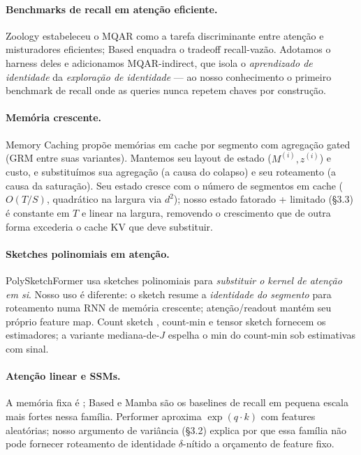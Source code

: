 \documentclass[11pt]{article}
\begin{document}
\paragraph{Benchmarks de recall em aten\c{c}\~ao eficiente.} Zoology
\citep{arora2023zoology} estabeleceu o MQAR como a tarefa discriminante entre
aten\c{c}\~ao e misturadores eficientes; Based \citep{arora2024based} enquadra o
tradeoff recall-vaz\~ao. Adotamos o harness deles e adicionamos MQAR-indirect,
que isola o \emph{aprendizado de identidade} da \emph{explora\c{c}\~ao de
identidade} --- ao nosso conhecimento o primeiro benchmark de recall onde as
queries nunca repetem chaves por constru\c{c}\~ao.

\paragraph{Mem\'oria crescente.} Memory Caching
\citep{behrouz2026memorycaching} prop\~oe mem\'orias em cache por segmento com
agrega\c{c}\~ao gated (GRM entre suas variantes). Mantemos seu layout de estado
($M^{(i)}, z^{(i)}$) e custo, e substitu\'imos sua agrega\c{c}\~ao (a causa do
colapso) e seu roteamento (a causa da satura\c{c}\~ao). Seu estado cresce com o
n\'umero de segmentos em cache ($O(T/S)$, quadr\'atico na largura via $d^2$);
nosso estado fatorado + limitado (\S3.3) \'e constante em $T$ e linear na
largura, removendo o crescimento que de outra forma excederia o cache KV que deve
substituir.

\paragraph{Sketches polinomiais em aten\c{c}\~ao.} PolySketchFormer
\citep{kacham2023polysketchformer} usa sketches polinomiais para
\emph{substituir o kernel de aten\c{c}\~ao em si}. Nosso uso \'e diferente: o
sketch resume a \emph{identidade do segmento} para roteamento numa RNN de
mem\'oria crescente; aten\c{c}\~ao/readout mant\'em seu pr\'oprio feature map.
Count sketch \citep{charikar2002countsketch}, count-min
\citep{cormode2005countmin} e tensor sketch \citep{pham2013tensorsketch}
fornecem os estimadores; a variante mediana-de-$J$ espelha o min do count-min sob
estimativas com sinal.

\paragraph{Aten\c{c}\~ao linear e SSMs.} A mem\'oria fixa \'e
\citet{katharopoulos2020linear}; Based e Mamba s\~ao os baselines de recall em
pequena escala mais fortes nessa fam\'ilia. Performer
\citep{choromanski2021performer} aproxima $\exp(q\!\cdot\!k)$ com features
aleat\'orias; nosso argumento de vari\^ancia (\S3.2) explica por que essa
fam\'ilia n\~ao pode fornecer roteamento de identidade $\delta$-n\'itido a
or\c{c}amento de feature fixo.
\end{document}
